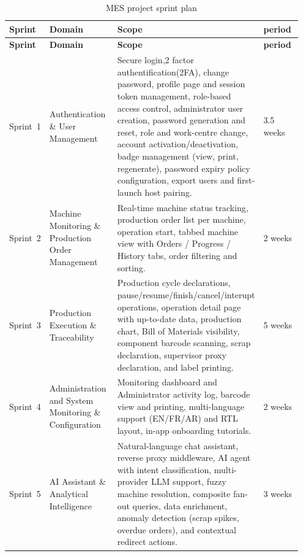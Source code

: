 \begin{longtable}{@{} P{0.10\linewidth} P{0.25\linewidth} P{0.45\linewidth} P{0.15\linewidth} @{}}
	\caption{MES project sprint plan}
	\label{tab:mescha-sprint_plan} \\
	\toprule
	\textbf{Sprint} & \textbf{Domain} & \textbf{Scope} & \textbf{period} \\
	\midrule
	\endfirsthead

	\toprule
	\textbf{Sprint} & \textbf{Domain} & \textbf{Scope} & \textbf{period} \\
	\midrule
	\endhead


	\endlastfoot

	Sprint~1        & Authentication \& User Management                 &
	Secure login,2 factor authentification(2FA), change password, profile page
	and session token management, role-based access control, administrator user
	creation, password generation and reset, role and work-centre change, account
	activation/deactivation, badge management (view, print, regenerate), password
	expiry	policy configuration, export users and first-launch host pairing.
	& 3.5 weeks \\ \midrule

	Sprint~2        & Machine Monitoring \& Production Order Management &
	Real-time machine status tracking, production order list per machine,
	operation start, tabbed machine view with Orders / Progress / History tabs,
	order filtering and sorting. 
	& 2 weeks \\ \midrule

	Sprint~3        & Production Execution \& Traceability              &
	Production cycle declarations, pause/resume/finish/cancel/interupt operations,
	operation detail page with up-to-date data, production chart, Bill of Materials
	visibility, component barcode scanning, scrap declaration,
	supervisor proxy declaration, and label printing. 
	& 5 weeks \\ \midrule

	Sprint~4        & Administration and System Monitoring \& Configuration              &
	Monitoring dashboard and Administrator activity log, barcode view and printing, 
	multi-language support (EN/FR/AR) and RTL layout, in-app onboarding tutorials. 
	& 2 weeks \\ \midrule

	Sprint~5        & AI Assistant \& Analytical Intelligence           &
	Natural-language chat assistant,  reverse proxy middleware,
	 AI agent with intent classification, multi-provider LLM support,
	fuzzy machine resolution, composite fan-out queries, data enrichment,
	anomaly detection (scrap spikes, overdue orders), and contextual
	redirect actions. 
	& 3 weeks\\ \midrule
\end{longtable}

